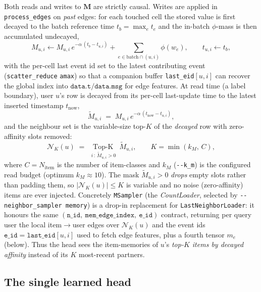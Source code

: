 \documentclass[11pt]{article}
\begin{document}
Both reads and writes to $\mathbf{M}$ are strictly causal. Writes are applied in \texttt{process\_edges} on \emph{past} edges: for each touched cell the stored value is first decayed to the batch reference time $t_b=\max_e t_e$ and the in-batch $\phi$-mass is then accumulated undecayed,
\begin{equation}
M_{u,i} \leftarrow M_{u,i}\, e^{-\alpha\,(t_b - t_{u,i})} + \!\!\sum_{e\in\text{batch}\cap(u,i)}\!\! \phi(w_e),
\qquad t_{u,i}\leftarrow t_b,
\end{equation}
with the per-cell last event id set to the latest contributing event (\texttt{scatter\_reduce} \texttt{amax}) so that a companion buffer \texttt{last\_eid}$[u,i]$ can recover the global index into $\texttt{data.t}/\texttt{data.msg}$ for edge features. At read time (a label boundary), user $u$'s row is decayed from its per-cell last-update time to the latest inserted timestamp $t_{\text{now}}$,
\begin{equation}
\tilde M_{u,i} \;=\; M_{u,i}\, e^{-\alpha\,(t_{\text{now}} - t_{u,i})},
\end{equation}
and the neighbour set is the variable-size top-$K$ of the \emph{decayed} row with zero-affinity slots removed:
\begin{equation}
\label{eq:selection}
\boxed{\;
\mathcal{N}_K(u) \;=\; \operatorname*{Top\text{-}K}_{\,i\,:\,\tilde M_{u,i}>0}\ \tilde M_{u,i},
\qquad K = \min(k_M,\, C),
\;}
\end{equation}
where $C=N_{\text{item}}$ is the number of item-classes and $k_M$ (\texttt{-{}-k\_m}) is the configured read budget (optimum $k_M\approx 10$). The mask $\tilde M_{u,i}>0$ \emph{drops} empty slots rather than padding them, so $|\mathcal{N}_K(u)|\le K$ is variable and no noise (zero-affinity) items are ever injected. Concretely \texttt{MSampler} (the \emph{CountLoader}, selected by \texttt{-{}-neighbor\_sampler memory}) is a drop-in replacement for \texttt{LastNeighborLoader}: it honours the same $(\texttt{n\_id},\ \texttt{mem\_edge\_index},\ \texttt{e\_id})$ contract, returning per query user the local item$\rightarrow$user edges over $\mathcal{N}_K(u)$ and the event ids $\texttt{e\_id}=\texttt{last\_eid}[u,i]$ used to fetch edge features, plus a fourth tensor $m_e$ (below). Thus the head sees the item-memories of $u$'s \emph{top-$K$ items by decayed affinity} instead of its $K$ most-recent partners.

\subsection{The single learned head}
\end{document}
